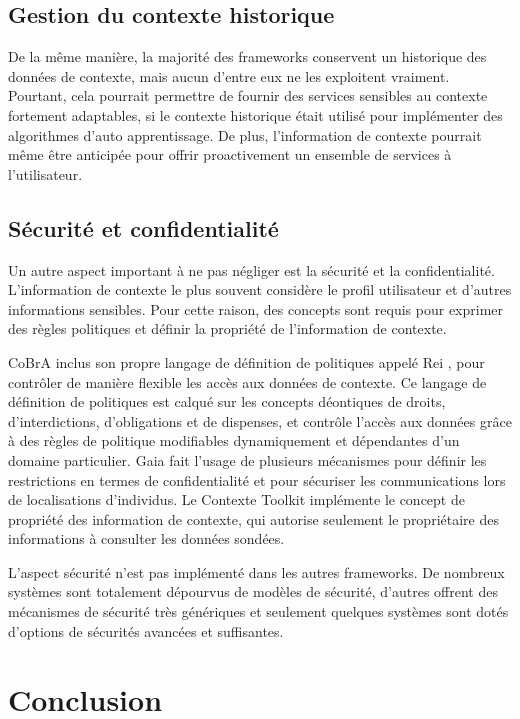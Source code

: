 \subsection{Gestion du contexte historique}

De la même manière, la majorité des frameworks conservent un historique des
données de contexte, mais aucun d'entre eux ne les exploitent vraiment.
Pourtant, cela pourrait permettre de fournir des services sensibles au contexte
fortement adaptables, si le contexte historique était utilisé pour implémenter
des algorithmes d'auto apprentissage. De plus, l'information de contexte
pourrait même être anticipée pour offrir proactivement un ensemble de services à
l'utilisateur.

\subsection{Sécurité et confidentialité}

Un autre aspect important à ne pas négliger est la sécurité et la
confidentialité. L'information de contexte le plus souvent considère le profil
utilisateur et d'autres informations sensibles. Pour cette raison, des concepts
sont requis pour exprimer des règles politiques et définir la propriété de
l'information de contexte. 

CoBrA inclus son propre langage de définition de politiques appelé Rei
\cite{kagal_policy_2005}, pour contrôler de manière flexible les accès aux
données de contexte. Ce langage de définition de politiques est calqué sur les
concepts déontiques de droits, d'interdictions, d'obligations et de dispenses,
et contrôle l'accès aux données grâce à des règles de politique modifiables
dynamiquement et dépendantes d'un domaine particulier. Gaia fait l'usage de
plusieurs mécanismes pour définir les restrictions en termes de confidentialité
et pour sécuriser les communications lors de localisations d'individus. Le
Contexte Toolkit implémente le concept de propriété des information de contexte,
qui autorise seulement le propriétaire des informations à consulter les données
sondées.

L'aspect sécurité n'est pas implémenté dans les autres frameworks. De nombreux
systèmes sont totalement dépourvus de modèles de sécurité, d'autres offrent des
mécanismes de sécurité très génériques et seulement quelques systèmes sont dotés
d'options de sécurités avancées et suffisantes.

\section{Conclusion}

